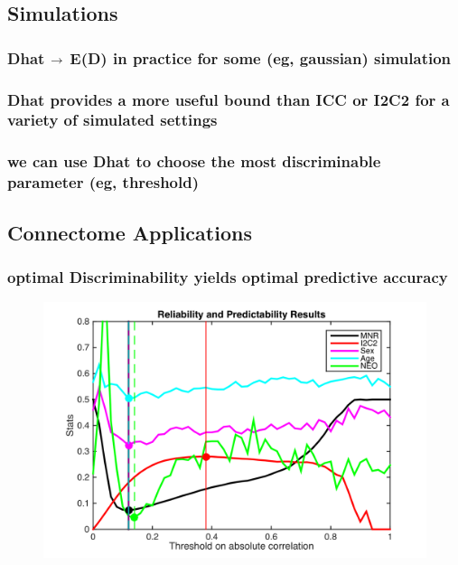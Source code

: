 \documentclass{article}
\begin{document}
\subsection{Simulations}

\subsubsection{Dhat $\rightarrow$ E(D) in practice for some (eg, gaussian) simulation}


\subsubsection{Dhat provides a more useful bound than ICC or I2C2 for a variety of simulated settings}

\subsubsection{we can use Dhat to choose the most discriminable parameter (eg, threshold)}


\subsection{Connectome Applications}

\subsubsection{optimal Discriminability yields optimal predictive accuracy}

\begin{figure}[t!]
\includegraphics[width=\linewidth]{../Figs/HCP.png}
\caption{}
\label{fig:64}
\end{figure}
\end{document}
